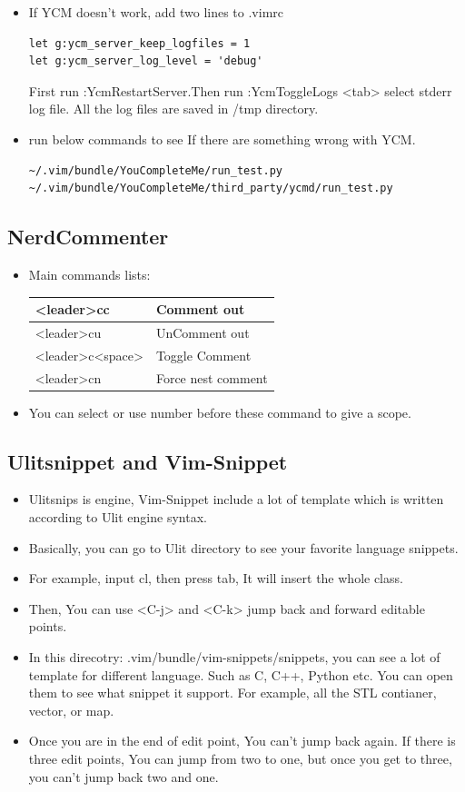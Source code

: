 \documentclass[a4paper,12pt,twoside]{book}
\begin{document}
\begin{itemize}
\begin{itemize}
\item If YCM doesn't work, add two lines to .vimrc 
\begin{verbatim}
let g:ycm_server_keep_logfiles = 1
let g:ycm_server_log_level = 'debug'
\end{verbatim}

First run :YcmRestartServer.Then run :YcmToggleLogs <tab> select stderr log file. All the log files are saved in /tmp directory. 


\item run below commands to see If there are something wrong with YCM. 	
\begin{verbatim}
~/.vim/bundle/YouCompleteMe/run_test.py
~/.vim/bundle/YouCompleteMe/third_party/ycmd/run_test.py
\end{verbatim}
\end{itemize}

\subsection{NerdCommenter}
\begin{itemize}
		\item Main commands lists:  

\begin{tabular}{p{}|p{}}
		\hline 
		[count]<leader>cc & Comment out \\
		\hline 
		[count]<leader>cu & UnComment out \\
		\hline 
		[count]<leader>c<space> & Toggle Comment \\
		\hline
		[count]<leader>cn & Force nest comment \\
\end{tabular}
\item You can select or use number before these command to give a scope. 
\end{itemize}

\subsection{Ulitsnippet and Vim-Snippet}
\begin{itemize}
\item Ulitsnips is engine, Vim-Snippet include a lot of template which is written according to Ulit engine syntax. 
\item Basically, you can go to Ulit directory to see your favorite language snippets. 
\item For example, input cl, then press tab, It will insert the whole class. 
\item Then, You can use <C-j> and <C-k> jump back and forward editable points. 
\item In this direcotry: .vim/bundle/vim-snippets/snippets, you can see a lot of template for different language. Such as C, C++, Python etc. You can open them to see what snippet it support. For example, all the STL contianer, vector, or map. 
\item Once you are in the end of edit point, You can't jump back again. If there is three edit points, You can jump from two to one, but once you get to three, you can't jump back two and one. 


\end{itemize}
\end{itemize}
\end{document}
